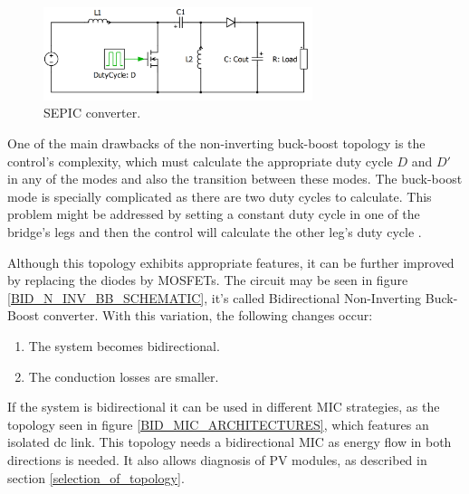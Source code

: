 \begin{figure}[htbp]
	\begin{center}
		\includegraphics[width=0.7\textwidth]{../Pictures/SEPIC}
		\caption{SEPIC converter.}
		\label{SEPIC_SCHEMATIC}
	\end{center}	
\end{figure}

One of the main drawbacks of the non-inverting buck-boost topology is the control's complexity, which must calculate the appropriate duty cycle $D$ and $D'$ in any of the modes and also the transition between these modes. The buck-boost mode is specially complicated as there are two duty cycles to calculate. This problem might be addressed by setting a constant duty cycle in one of the bridge's legs and then the control will calculate the other leg's duty cycle  \cite{AN4449_ST}.
		
Although this topology exhibits appropriate features, it can be further improved by replacing the diodes by MOSFETs. The circuit may be seen in figure \ref{BID_N_INV_BB_SCHEMATIC}, it's called Bidirectional Non-Inverting Buck-Boost converter. With this variation, the following changes occur:
		
\begin{enumerate}
	\item The system becomes bidirectional.
	\item The conduction losses are smaller. 
\end{enumerate}
	
If the system is bidirectional it can be used in different MIC strategies, as the topology seen in figure \ref{BID_MIC_ARCHITECTURES}, which features an isolated dc link. This topology needs a bidirectional MIC as energy flow in both directions is needed. It also allows diagnosis of PV modules, as described in section \ref{selection_of_topology}.

